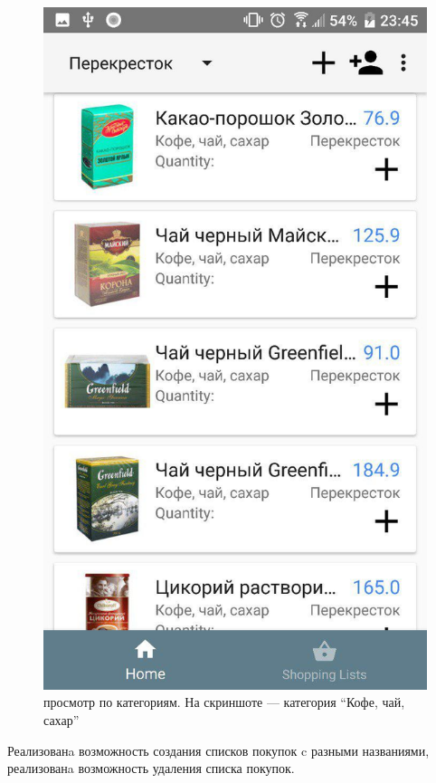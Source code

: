 \begin{figure}[h!]
    \includegraphics[height=0.38\textheight]{./screenshots/3/categ_filter.jpg}
    \caption{\small{просмотр по категориям. На скриншоте --- категория ``Кофе, чай, сахар''}}
    \endminipage{}
\end{figure}

Реализованa возможность создания списков покупок c разными названиями,
реализованa возможность удаления списка покупок.

